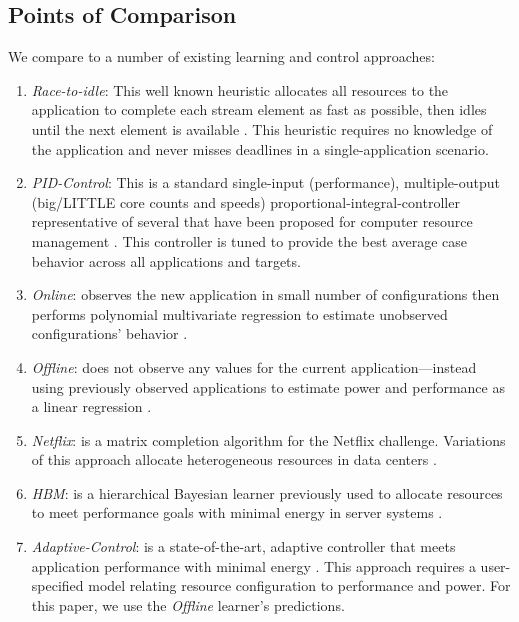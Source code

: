 \subsection{Points of Comparison}
We compare \SYSTEM{} to a number of existing learning and control
approaches:
\begin{enumerate}
\item \textit{Race-to-idle}: This well known heuristic allocates all
  resources to the application to complete each stream element as fast
  as possible, then idles until the next element is available
  \cite{kim-cpsna,powerslope,heisner}.  This heuristic requires no
  knowledge of the application and never misses deadlines in a
  single-application scenario.
\item \textit{PID-Control}: This is a standard single-input
  (performance), multiple-output (big/LITTLE core counts and speeds)
  proportional-integral-controller representative of several that have
  been proposed for computer resource management
  \cite{Hellerstein2004a,METE}.  This controller is tuned to provide
  the best average case behavior across all applications and targets.
\item \textit{Online}: observes the new application in small number of
  configurations then performs polynomial multivariate regression to
  estimate unobserved configurations' behavior
  \cite{LEO,Li2006,Ponamarev}.
\item \textit{Offline}: does not observe any values for the current
  application---instead using previously observed applications to
  estimate power and performance as a linear regression
  \cite{PUPiL,LeeBrooks2006,CPR}.
\item \textit{Netflix}: is a matrix completion algorithm for the
  Netflix challenge. Variations of this approach allocate
  heterogeneous resources in data centers \cite{Paragon,quasar}.
\item \textit{HBM}: is a hierarchical Bayesian learner previously used
  to allocate resources to meet performance goals with minimal energy
  in server systems \cite{LEO}.
\item \textit{Adaptive-Control}: is a state-of-the-art, adaptive
  controller that meets application performance with minimal energy
  \cite{POET}.  This approach requires a user-specified model relating
  resource configuration to performance and power.  For this paper, we
  use the \emph{Offline} learner's predictions.  
\end{enumerate}



